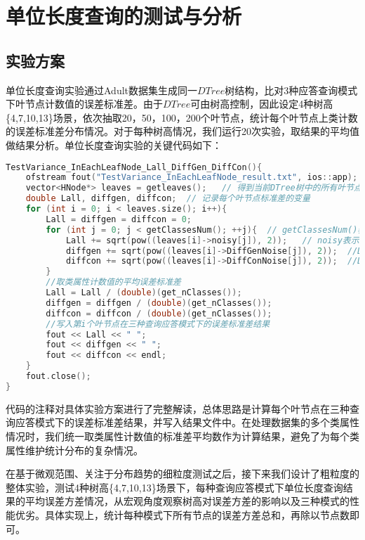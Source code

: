 \section{单位长度查询的测试与分析} 
\subsection{实验方案}
单位长度查询实验通过Adult数据集生成同一$DTree$树结构，比对3种应答查询模式下叶节点计数值的误差标准差。由于$DTree$可由树高控制，因此设定4种树高\{4,7,10,13\}场景，依次抽取20，50，100，200个叶节点，统计每个叶节点上类计数的误差标准差分布情况。对于每种树高情况，我们运行20次实验，取结果的平均值做结果分析。单位长度查询实验的关键代码如下：
\begin{lstlisting}[language={C++}, caption={单位长度查询实验}]
TestVariance_InEachLeafNode_Lall_DiffGen_DiffCon(){
	ofstream fout("TestVariance_InEachLeafNode_result.txt", ios::app);
	vector<HNode*> leaves = getleaves();   // 得到当前DTree树中的所有叶节点
	double Lall, diffgen, diffcon;  // 记录每个叶节点标准差的变量
	for (int i = 0; i < leaves.size(); i++){   
		Lall = diffgen = diffcon = 0;       
		for (int j = 0; j < getClassesNum(); ++j){  // getClassesNum()表示类属性个数，遍历每个类属性
			Lall += sqrt(pow((leaves[i]->noisy[j]), 2));   // noisy表示$\tilde{L}_{all}(D)$方式加的噪音
			diffgen += sqrt(pow((leaves[i]->DiffGenNoise[j]), 2));  //DiffGenNoise表示DiffGen方式加的噪音
			diffcon += sqrt(pow((leaves[i]->DiffConNoise[j]), 2));  //DiffConNoise表示DiffCon方式加的噪音
		}
		//取类属性计数值的平均误差标准差
		Lall = Lall / (double)(get_nClasses());  
		diffgen = diffgen / (double)(get_nClasses());
		diffcon = diffcon / (double)(get_nClasses());
		//写入第i个叶节点在三种查询应答模式下的误差标准差结果
		fout << Lall << " ";  
		fout << diffgen << " ";  
		fout << diffcon << endl; 
	}
	fout.close();
}
\end{lstlisting}
代码的注释对具体实验方案进行了完整解读，总体思路是计算每个叶节点在三种查询应答模式下的误差标准差结果，并写入结果文件中。在处理数据集的多个类属性情况时，我们统一取类属性计数值的标准差平均数作为计算结果，避免了为每个类属性维护统计分布的复杂情况。

在基于微观范围、关注于分布趋势的细粒度测试之后，接下来我们设计了粗粒度的整体实验，测试4种树高\{4,7,10,13\}场景下，每种查询应答模式下单位长度查询结果的平均误差方差情况，从宏观角度观察树高对误差方差的影响以及三种模式的性能优劣。具体实现上，统计每种模式下所有节点的误差方差总和，再除以节点数即可。


